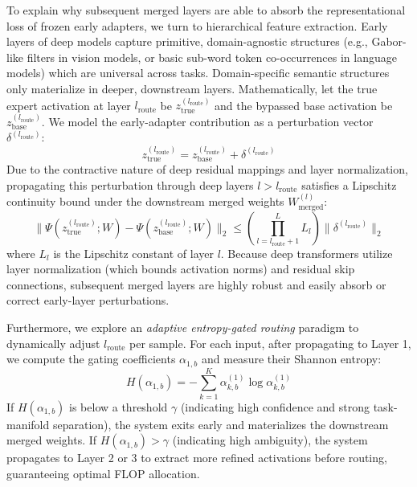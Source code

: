 To explain why subsequent merged layers are able to absorb the representational loss of frozen early adapters, we turn to hierarchical feature extraction. Early layers of deep models capture primitive, domain-agnostic structures (e.g., Gabor-like filters in vision models, or basic sub-word token co-occurrences in language models) which are universal across tasks. Domain-specific semantic structures only materialize in deeper, downstream layers. 
Mathematically, let the true expert activation at layer $l_{\text{route}}$ be $z_{\text{true}}^{(l_{\text{route}})}$ and the bypassed base activation be $z_{\text{base}}^{(l_{\text{route}})}$. We model the early-adapter contribution as a perturbation vector $\delta^{(l_{\text{route}})}$:
\begin{equation}
    z_{\text{true}}^{(l_{\text{route}})} = z_{\text{base}}^{(l_{\text{route}})} + \delta^{(l_{\text{route}})}
\end{equation}
Due to the contractive nature of deep residual mappings and layer normalization, propagating this perturbation through deep layers $l > l_{\text{route}}$ satisfies a Lipschitz continuity bound under the downstream merged weights $W_{\text{merged}}^{(l)}$:
\begin{equation}
    \|\Psi(z_{\text{true}}^{(l_{\text{route}})}; W) - \Psi(z_{\text{base}}^{(l_{\text{route}})}; W)\|_2 \le \left(\prod_{l=l_{\text{route}}+1}^L L_l\right) \|\delta^{(l_{\text{route}})}\|_2
\end{equation}
where $L_l$ is the Lipschitz constant of layer $l$. Because deep transformers utilize layer normalization (which bounds activation norms) and residual skip connections, subsequent merged layers are highly robust and easily absorb or correct early-layer perturbations.

Furthermore, we explore an \emph{adaptive entropy-gated routing} paradigm to dynamically adjust $l_{\text{route}}$ per sample. For each input, after propagating to Layer 1, we compute the gating coefficients $\alpha_{1, b}$ and measure their Shannon entropy:
\begin{equation}
    H(\alpha_{1, b}) = -\sum_{k=1}^K \alpha_{k, b}^{(1)} \log \alpha_{k, b}^{(1)}
\end{equation}
If $H(\alpha_{1, b})$ is below a threshold $\gamma$ (indicating high confidence and strong task-manifold separation), the system exits early and materializes the downstream merged weights. If $H(\alpha_{1, b}) > \gamma$ (indicating high ambiguity), the system propagates to Layer 2 or 3 to extract more refined activations before routing, guaranteeing optimal FLOP allocation.


